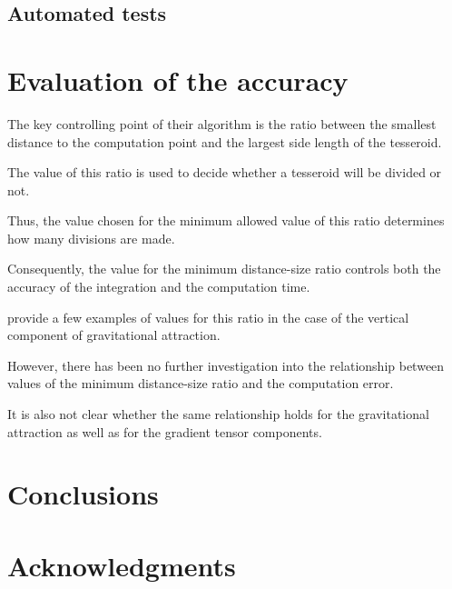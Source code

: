 \documentclass[paper,twocolumn]{geophysics}
\begin{document}
\subsection{Automated tests}

\section{Evaluation of the accuracy}

The key controlling point of their algorithm is the ratio between
the smallest distance to the computation point and
the largest side length of the tesseroid.

The value of this ratio is used to decide whether a tesseroid will be divided
or not.

Thus, the value chosen for the minimum allowed value of this ratio determines
how many divisions are made.

Consequently, the value for the minimum distance-size ratio controls both the
accuracy of the integration and the computation time.

\citet{Li2011} provide a few examples of values for this ratio in the case of
the vertical component of gravitational attraction.

However, there has been no further investigation into
the relationship between values of the minimum distance-size
ratio and the computation error.

It is also not clear whether the same relationship holds for the gravitational
attraction as well as for the gradient tensor components.



\section{Conclusions}

\section{Acknowledgments}




\end{document}

